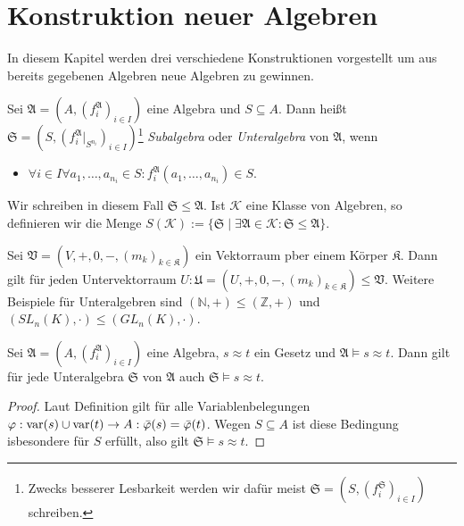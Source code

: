 \section{Konstruktion neuer Algebren}

In diesem Kapitel werden drei verschiedene Konstruktionen vorgestellt um aus bereits gegebenen Algebren neue Algebren zu gewinnen.

\begin{definition}
    Sei $\mathfrak{A}=(A,(f^\mathfrak{A}_i)_{i\in I})$ eine Algebra und $S\subseteq A$. Dann heißt $\mathfrak{S}=(S,(f^\mathfrak{A}_i|_{S^{n_i}})_{i\in I})$\footnote{Zwecks besserer Lesbarkeit werden wir dafür meist $\mathfrak{S}=(S,(f^\mathfrak{S}_i)_{i\in I})$ schreiben.}
    \emph{Subalgebra} oder \emph{Unteralgebra} von $\mathfrak{A}$, wenn
    \begin{itemize}[topsep=0pt, label={--}]
        \item $\forall i\in I\forall a_1,\ldots,a_{n_i}\in S:f^\mathfrak{A}_i(a_1,\ldots,a_{n_i})\in S.$
    \end{itemize}
    Wir schreiben in diesem Fall $\mathfrak{S}\le \mathfrak{A}$. Ist $\mathcal{K}$ eine Klasse von Algebren,
    so definieren wir die Menge $S(\mathcal{K}):=\{\mathfrak{S} \mid \exists \mathfrak{A}\in \mathcal{K}:\mathfrak{S}\le\mathfrak{A}\}$.
\end{definition}

\begin{example}
    Sei $\mathfrak{V}=(V,+,0,-,(m_k)_{k\in\mathfrak{K}})$ ein Vektorraum pber einem Körper $\mathfrak{K}$. Dann gilt für
    jeden Untervektorraum $U:\mathfrak{U}=(U,+,0,-,(m_k)_{k\in\mathfrak{K}})\le \mathfrak{V}$. Weitere
    Beispiele für Unteralgebren sind $(\mathbb{N},+)\le(\mathbb{Z},+)$ und $(SL_n(K),\cdot)\le (GL_n(K),\cdot)$.
\end{example}

\begin{proposition}\label{prop:unteralgebra}
    Sei $\mathfrak{A}=(A,(f^\mathfrak{A}_i)_{i\in I})$ eine Algebra, $s\approx t$ ein Gesetz und $\mathfrak{A}\models s\approx t$.
    Dann gilt für jede Unteralgebra $\mathfrak{S}$ von $\mathfrak{A}$ auch $\mathfrak{S}\models s\approx t$.
\end{proposition}

\begin{proof}
    Laut Definition gilt für alle Variablenbelegungen $\varphi:\operatorname{var}(s)\cup \operatorname{var}(t)\to A:\bar{\varphi}(s)=\bar{\varphi}(t)$.
    Wegen $S\subseteq A$ ist diese Bedingung isbesondere für $S$ erfüllt, also gilt $\mathfrak{S}\models s\approx t$.
\end{proof}

